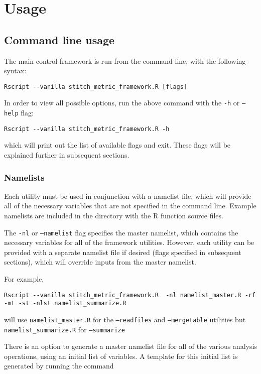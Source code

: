\documentclass{article}
\begin{document}
\section{Usage}
\subsection{Command line usage}
The main control framework is run from the command line, with the following syntax:
\begin{verbatim}
Rscript --vanilla stitch_metric_framework.R [flags]
\end{verbatim}

In order to view all possible options, run the above command with the \texttt{-h} or \texttt{--help} flag:
\begin{verbatim}
Rscript --vanilla stitch_metric_framework.R -h
\end{verbatim}

which will print out the list of available flags and exit. These flags will be explained further in subsequent sections.

\subsubsection{Namelists}
Each utility must be used in conjunction with a namelist file, which will provide all of the necessary variables that are not specified in the command line. Example namelists are included in the directory with the R function source files.

The \texttt{-nl} or \texttt{--namelist} flag specifies the master namelist, which contains the necessary variables for all of the framework utilities. However, each utility can be provided with a separate namelist file if desired (flags specified in subsequent sections), which will override inputs from the master namelist.

For example, 

\begin{verbatim}
Rscript --vanilla stitch_metric_framework.R  -nl namelist_master.R -rf
-mt -st -nlst namelist_summarize.R
\end{verbatim}

will use \texttt{namelist\_master.R} for the \texttt{--readfiles} and \texttt{--mergetable} utilities but \texttt{namelist\_summarize.R} for \texttt{--summarize}

There is an option to generate a master namelist file for all of the various analysis operations, using an initial list of variables. A template for this initial list is generated by running the command
\end{document}
